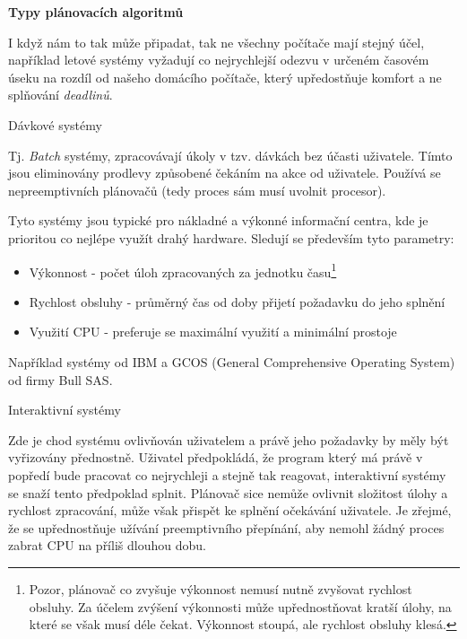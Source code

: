\begin{Large}
    \textbf{Typy plánovacích algoritmů}
\end{Large}

I když nám to tak může připadat, tak ne všechny počítače mají stejný účel, například letové systémy vyžadují co nejrychlejší odezvu v určeném časovém úseku na rozdíl od našeho domácího počítače, který upředostňuje komfort a ne splňování \textit{deadlinů}.

\begin{large}
    \vspace{0,5cm}
    Dávkové systémy
\end{large}

Tj. \textit{Batch} systémy, zpracovávají úkoly v tzv. dávkách bez účasti uživatele. Tímto jsou eliminovány prodlevy způsobené čekáním na akce od uživatele. Používá se nepreemptivních plánovačů (tedy proces sám musí uvolnit procesor). 

\vspace{0,5cm}

Tyto systémy jsou typické pro nákladné a výkonné informační centra, kde je prioritou co nejlépe využít drahý hardware. Sledují se především tyto parametry:

\begin{itemize}
    \item Výkonnost - počet úloh zpracovaných za jednotku času\footnote{Pozor, plánovač co zvyšuje výkonnost nemusí nutně zvyšovat rychlost obsluhy. Za účelem zvýšení výkonnosti může upřednostňovat kratší úlohy, na které se však musí déle čekat. Výkonnost stoupá, ale rychlost obsluhy klesá.} 
    \item Rychlost obsluhy - průměrný čas od doby přijetí požadavku do jeho splnění
    \item Využití CPU - preferuje se maximální využití a minimální prostoje
\end{itemize}

Například systémy od IBM a GCOS (General Comprehensive Operating System) od firmy Bull SAS.

\begin{large}
    \vspace{0,5cm}
    Interaktivní systémy
\end{large}

Zde je chod systému ovlivňován uživatelem a právě jeho požadavky by měly být vyřizovány přednostně. Uživatel předpokládá, že program který má právě v popředí bude pracovat co nejrychleji a stejně tak reagovat, interaktivní systémy se snaží tento předpoklad splnit. Plánovač sice nemůže ovlivnit složitost úlohy a rychlost zpracování, může však přispět ke splnění očekávání uživatele. Je zřejmé, že se upřednostňuje užívání preemptivního přepínání, aby nemohl žádný proces zabrat CPU na příliš dlouhou dobu. 

